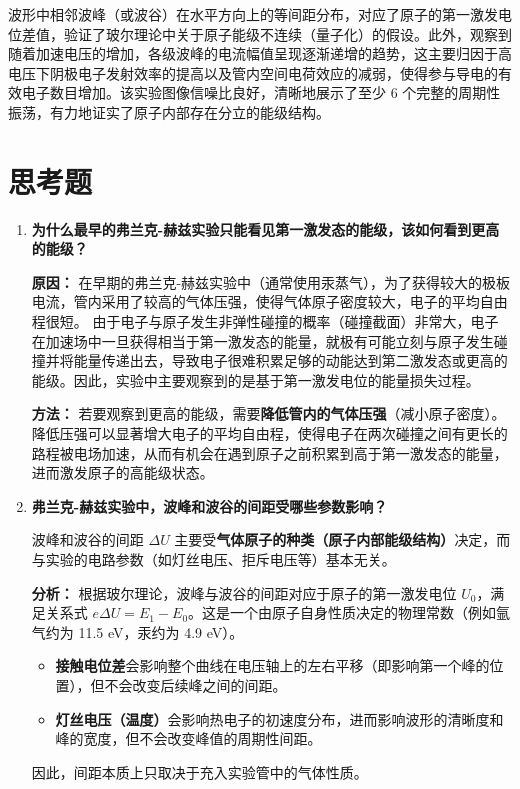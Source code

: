 \documentclass[11pt]{article}
\begin{document}
波形中相邻波峰（或波谷）在水平方向上的等间距分布，对应了原子的第一激发电位差值，验证了玻尔理论中关于原子能级不连续（量子化）的假设。此外，观察到随着加速电压的增加，各级波峰的电流幅值呈现逐渐递增的趋势，这主要归因于高电压下阴极电子发射效率的提高以及管内空间电荷效应的减弱，使得参与导电的有效电子数目增加。该实验图像信噪比良好，清晰地展示了至少 6 个完整的周期性振荡，有力地证实了原子内部存在分立的能级结构。

\section{思考题}

\begin{enumerate}
    \item \textbf{为什么最早的弗兰克-赫兹实验只能看见第一激发态的能级，该如何看到更高的能级？}
    
    \textbf{原因：} 
    在早期的弗兰克-赫兹实验中（通常使用汞蒸气），为了获得较大的极板电流，管内采用了较高的气体压强，使得气体原子密度较大，电子的平均自由程很短。
    由于电子与原子发生非弹性碰撞的概率（碰撞截面）非常大，电子在加速场中一旦获得相当于第一激发态的能量，就极有可能立刻与原子发生碰撞并将能量传递出去，导致电子很难积累足够的动能达到第二激发态或更高的能级。因此，实验中主要观察到的是基于第一激发电位的能量损失过程。
    
    \textbf{方法：} 
    若要观察到更高的能级，需要\textbf{降低管内的气体压强}（减小原子密度）。
    降低压强可以显著增大电子的平均自由程，使得电子在两次碰撞之间有更长的路程被电场加速，从而有机会在遇到原子之前积累到高于第一激发态的能量，进而激发原子的高能级状态。

    \item \textbf{弗兰克-赫兹实验中，波峰和波谷的间距受哪些参数影响？}
    
    波峰和波谷的间距 $\Delta U$ 主要受\textbf{气体原子的种类（原子内部能级结构）}决定，而与实验的电路参数（如灯丝电压、拒斥电压等）基本无关。
    
    \textbf{分析：}
    根据玻尔理论，波峰与波谷的间距对应于原子的第一激发电位 $U_0$，满足关系式 $e \Delta U = E_1 - E_0$。这是一个由原子自身性质决定的物理常数（例如氩气约为 11.5 eV，汞约为 4.9 eV）。
    \begin{itemize}
        \item \textbf{接触电位差}会影响整个曲线在电压轴上的左右平移（即影响第一个峰的位置），但不会改变后续峰之间的间距。
        \item \textbf{灯丝电压（温度）}会影响热电子的初速度分布，进而影响波形的清晰度和峰的宽度，但不会改变峰值的周期性间距。
    \end{itemize}
    因此，间距本质上只取决于充入实验管中的气体性质。
\end{enumerate}
\end{document}

